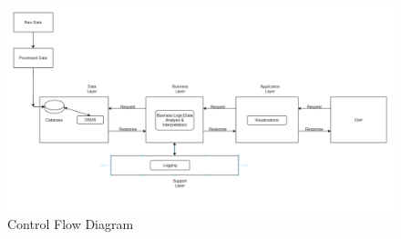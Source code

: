 \label{sec:control-flow}
\begin{figure}
	\centering
	\includegraphics[width=1.2\linewidth]{images/Control Flow.png}
	\caption{Control Flow Diagram}
\end{figure} 